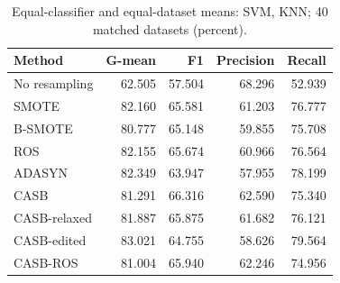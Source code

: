 \begin{table}[pos=!htbp]
\centering\small
\caption{Equal-classifier and equal-dataset means: SVM, KNN; 40 matched datasets (percent).}\label{tab:scores_svm_knn}
\begin{tabular}{lrrrr}\toprule
Method & G-mean & F1 & Precision & Recall \\
\midrule
No resampling & 62.505 & 57.504 & 68.296 & 52.939 \\
SMOTE & 82.160 & 65.581 & 61.203 & 76.777 \\
B-SMOTE & 80.777 & 65.148 & 59.855 & 75.708 \\
ROS & 82.155 & 65.674 & 60.966 & 76.564 \\
ADASYN & 82.349 & 63.947 & 57.955 & 78.199 \\
CASB & 81.291 & 66.316 & 62.590 & 75.340 \\
CASB-relaxed & 81.887 & 65.875 & 61.682 & 76.121 \\
CASB-edited & 83.021 & 64.755 & 58.626 & 79.564 \\
CASB-ROS & 81.004 & 65.940 & 62.246 & 74.956 \\
\bottomrule\end{tabular}
\end{table}

